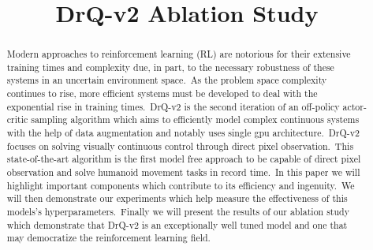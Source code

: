 \documentclass[conference]{./IEEEtran/IEEEtran} %
\begin{document}
    \title{DrQ-v2 Ablation Study}

    \author{
        \and
        \and
    }

    \maketitle

    \begin{abstract}
        
    Modern approaches to reinforcement learning (RL) are notorious for their extensive training times and complexity due, in
    part, to the necessary robustness of these systems in an uncertain environment space.\ As the problem space complexity
    continues to rise, more efficient systems must be developed to deal with the exponential rise in training times.\ DrQ-v2 \cite{DrQv2}
    is the second iteration of an off-policy actor-critic sampling algorithm which aims to efficiently model complex continuous
    systems with the help of data augmentation and notably uses single gpu architecture.\ DrQ-v2 focuses on solving visually
    continuous control through direct pixel observation.\ This state-of-the-art algorithm is the first model free approach to be
    capable of direct pixel observation and solve humanoid movement tasks in record time.\ In this paper we will highlight
    important components which contribute to its efficiency and ingenuity.\ We will then demonstrate our experiments which help
    measure the effectiveness of this models's hyperparameters.\ Finally we will present the results of our ablation study which
    demonstrate that DrQ-v2 is an exceptionally well tuned model and one that may democratize the reinforcement learning field.\

    \end{abstract}
\end{document}

